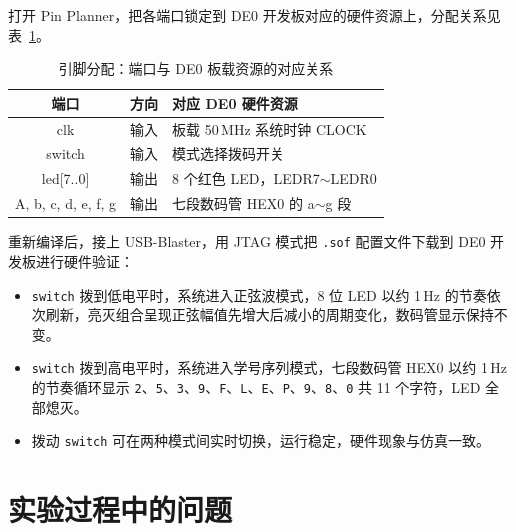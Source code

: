 \documentclass{ctexrep}
\begin{document}
打开 Pin Planner，把各端口锁定到 DE0 开发板对应的硬件资源上，分配关系见表~\ref{e5:tab:pins}。

\begin{table}[H]
    \centering
    \caption{引脚分配：端口与 DE0 板载资源的对应关系}
    \label{e5:tab:pins}
    \begin{tabular}{ccl}
        \toprule
        \textbf{端口} & \textbf{方向} & \textbf{对应 DE0 硬件资源} \\
        \midrule
        clk               & 输入 & 板载 50\,MHz 系统时钟 CLOCK \\
        switch            & 输入 & 模式选择拨码开关 \\
        led[7..0]         & 输出 & 8 个红色 LED，LEDR7$\sim$LEDR0 \\
        A, b, c, d, e, f, g & 输出 & 七段数码管 HEX0 的 a$\sim$g 段 \\
        \bottomrule
    \end{tabular}
\end{table}

重新编译后，接上 USB-Blaster，用 JTAG 模式把 \texttt{.sof} 配置文件下载到 DE0 开发板进行硬件验证：

\begin{itemize}
    \item \texttt{switch} 拨到低电平时，系统进入正弦波模式，8 位 LED 以约 1\,Hz 的节奏依次刷新，亮灭组合呈现正弦幅值先增大后减小的周期变化，数码管显示保持不变。
    \item \texttt{switch} 拨到高电平时，系统进入学号序列模式，七段数码管 HEX0 以约 1\,Hz 的节奏循环显示 \texttt{2}、\texttt{5}、\texttt{3}、\texttt{9}、\texttt{F}、\texttt{L}、\texttt{E}、\texttt{P}、\texttt{9}、\texttt{8}、\texttt{0} 共 11 个字符，LED 全部熄灭。
    \item 拨动 \texttt{switch} 可在两种模式间实时切换，运行稳定，硬件现象与仿真一致。
\end{itemize}

\section{实验过程中的问题}
\end{document}

